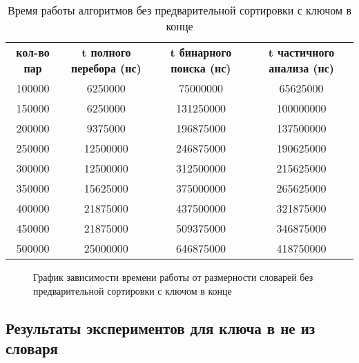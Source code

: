 \newpage
\begin{table}[ph!]
  \begin{center}
    \captionsetup{justification=raggedright}
     \caption{Время работы алгоритмов без предварительной сортировки с ключом в конце}
    \label{tab:workcost_classic}
    \begin{tabular}{c|c|c|c}
      \textbf{кол-во пар} & \textbf{t полного перебора (нс)}  & \textbf{t бинарного поиска (нс)} & \textbf{t частичного анализа (нс)}\\
	100000 & 6250000 & 75000000 & 65625000\\
	150000 & 6250000 & 131250000 & 100000000\\
	200000 & 9375000 & 196875000 & 137500000\\
	250000 & 12500000 & 246875000 & 190625000\\
	300000 & 12500000 & 312500000 & 215625000\\
	350000 & 15625000 & 375000000 & 265625000\\
	400000 & 21875000 & 437500000 & 321875000\\
	450000 & 21875000 & 509375000 & 346875000\\
	500000 & 25000000 & 646875000 & 418750000\\
      \hline	
    \end{tabular}
  \end{center}
\end{table}

\begin{figure}[ph!]
	\caption{График зависимости времени работы от размерности словарей без предварительной сортировки с ключом в конце}
\end{figure}

\newpage
\subsection{Результаты экспериментов для ключа в не из словаря}

